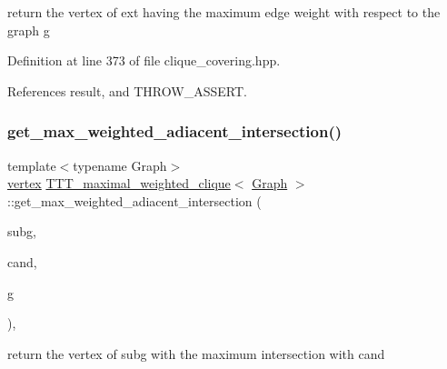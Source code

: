 return the vertex of ext having the maximum edge weight with respect to the graph g 



Definition at line 373 of file clique\+\_\+covering.\+hpp.



References result, and T\+H\+R\+O\+W\+\_\+\+A\+S\+S\+E\+RT.

\mbox{\label{classTTT__maximal__weighted__clique_a16578cc181d38985609a864fd37a155f}} 
\subsubsection{\texorpdfstring{get\+\_\+max\+\_\+weighted\+\_\+adiacent\+\_\+intersection()}{get\_max\_weighted\_adiacent\_intersection()}}
{\footnotesize\ttfamily template$<$typename Graph$>$ \\
\hyperlink{classTTT__maximal__weighted__clique_ac6a30ba8fb726c9c83eafe9dc451a799}{vertex} \hyperlink{classTTT__maximal__weighted__clique}{T\+T\+T\+\_\+maximal\+\_\+weighted\+\_\+clique}$<$ \hyperlink{structGraph}{Graph} $>$\+::get\+\_\+max\+\_\+weighted\+\_\+adiacent\+\_\+intersection (\begin{DoxyParamCaption}\item[{const \hyperlink{classCustomUnorderedSet}{Custom\+Unordered\+Set}$<$ \hyperlink{classTTT__maximal__weighted__clique_ac6a30ba8fb726c9c83eafe9dc451a799}{vertex} $>$ \&}]{subg,  }\item[{const \hyperlink{classCustomUnorderedSet}{Custom\+Unordered\+Set}$<$ \hyperlink{classTTT__maximal__weighted__clique_ac6a30ba8fb726c9c83eafe9dc451a799}{vertex} $>$ \&}]{cand,  }\item[{const \hyperlink{structGraph}{Graph} \&}]{g }\end{DoxyParamCaption})\hspace{0.3cm}{\ttfamily [inline]}, {\ttfamily [private]}}



return the vertex of subg with the maximum intersection with cand 



